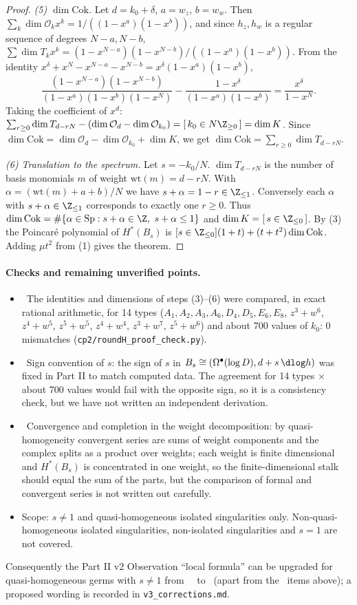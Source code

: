 \begin{proof}
\emph{(5) $\dim\mathrm{Cok}$.} Let $d=k_0+\delta$, $a=w_z$, $b=w_w$. Then $\sum_k\dim\mathcal O_kx^k=1/((1-x^a)(1-x^b))$, and since $h_z,h_w$ is a regular sequence of degrees $N-a,N-b$, $\sum\dim T_kx^k=(1-x^{N-a})(1-x^{N-b})/((1-x^a)(1-x^b))$. From the identity $x^\delta+x^N-x^{N-a}-x^{N-b}=x^\delta(1-x^a)(1-x^b)$,
\[\frac{(1-x^{N-a})(1-x^{N-b})}{(1-x^a)(1-x^b)(1-x^N)}-\frac{1-x^\delta}{(1-x^a)(1-x^b)}=\frac{x^\delta}{1-x^N}.\]
Taking the coefficient of $x^d$: $\sum_{r\ge0}\dim T_{d-rN}-(\dim\mathcal O_d-\dim\mathcal O_{k_0})=[\,k_0\in N\Z_{\ge0}\,]=\dim K$. Since $\dim\mathrm{Cok}=\dim\mathcal O_d-\dim\mathcal O_{k_0}+\dim K$, we get $\dim\mathrm{Cok}=\sum_{r\ge0}\dim T_{d-rN}$.

\emph{(6) Translation to the spectrum.} Let $s=-k_0/N$. $\dim T_{d-rN}$ is the number of basis monomials $m$ of weight $\mathrm{wt}(m)=d-rN$. With $\alpha=(\mathrm{wt}(m)+a+b)/N$ we have $s+\alpha=1-r\in\Z_{\le1}$. Conversely each $\alpha$ with $s+\alpha\in\Z_{\le1}$ corresponds to exactly one $r\ge0$. Thus $\dim\mathrm{Cok}=\#\{\alpha\in\mathrm{Sp}:s+\alpha\in\Z,\ s+\alpha\le1\}$ and $\dim K=[\,s\in\Z_{\le0}\,]$. By (3) the Poincar\'e polynomial of $H^*(B_s)$ is $[s\in\Z_{\le0}](1+t)+(t+t^2)\dim\mathrm{Cok}$. Adding $\mu t^2$ from (1) gives the theorem.
\end{proof}
\paragraph{Checks and remaining unverified points.}
\begin{itemize}
\item \tV\ The identities and dimensions of steps (3)--(6) were compared, in exact rational arithmetic, for 14 types ($A_1,A_2,A_3,A_6,D_4,D_5,E_6,E_8$, $z^3+w^6$, $z^4+w^5$, $z^5+w^5$, $z^4+w^4$, $z^3+w^7$, $z^5+w^6$) and about 700 values of $k_0$: 0 mismatches (\texttt{cp2/roundH\_proof\_check.py}).
\item \tQ\ Sign convention of $s$: the sign of $s$ in $B_s\cong(\Omega^\bullet(\log D),d+s\,\dlog h)$ was fixed in Part II to match computed data. The agreement for 14 types $\times$ about 700 values would fail with the opposite sign, so it is a consistency check, but we have not written an independent derivation.
\item \tQ\ Convergence and completion in the weight decomposition: by quasi-homogeneity convergent series are sums of weight components and the complex splits as a product over weights; each weight is finite dimensional and $H^*(B_s)$ is concentrated in one weight, so the finite-dimensional stalk should equal the sum of the parts, but the comparison of formal and convergent series is not written out carefully.
\item Scope: $s\ne1$ and quasi-homogeneous isolated singularities only. Non-quasi-homogeneous isolated singularities, non-isolated singularities and $s=1$ are not covered.
\end{itemize}
Consequently the Part II v2 Observation ``local formula'' can be upgraded for quasi-homogeneous germs with $s\ne1$ from \tV\ \tK\ to \tP\ (apart from the \tQ\ items above); a proposed wording is recorded in \texttt{v3\_corrections.md}.

